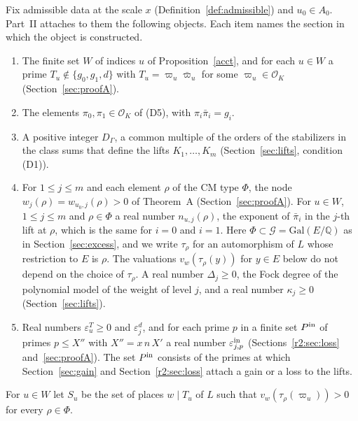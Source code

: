 Fix admissible data at the scale $x$ (Definition~\ref{def:admissible}) and $u_0\in A_0$. Part~II attaches to them the following objects. Each item names the section in which the object is constructed.
\begin{enumerate}
\item[(L1)] The finite set $W$ of indices $u$ of Proposition~\ref{acct}, and for each $u\in W$ a prime $T_u\notin\{g_0,g_1,d\}$ with $T_u=\varpi_u\bar\varpi_u$ for some $\varpi_u\in\mathcal O_K$ (Section~\ref{sec:proofA}).
\item[(L2)] The elements $\pi_0,\pi_1\in\mathcal O_K$ of (D5), with $\pi_i\bar\pi_i=g_i$.
\item[(L3)] A positive integer $D_\Gamma$, a common multiple of the orders of the stabilizers in the class sums that define the lifts $K_1,\dots,K_m$ (Section~\ref{sec:lifts}, condition (D1)).
\item[(L4)] For $1\le j\le m$ and each element $\rho$ of the CM type $\Phi$, the node $w_j(\rho)=w_{u_0,j}(\rho)>0$ of Theorem~A (Section~\ref{sec:proofA}). For $u\in W$, $1\le j\le m$ and $\rho\in\Phi$ a real number $n_{u,j}(\rho)$, the exponent of $\bar\pi_i$ in the $j$-th lift at $\rho$, which is the same for $i=0$ and $i=1$. Here $\Phi\subset\mathcal G=\mathrm{Gal}(E/\mathbb Q)$ as in Section~\ref{sec:excess}, and we write $\tau_\rho$ for an automorphism of $L$ whose restriction to $E$ is $\rho$. The valuations $v_w(\tau_\rho(y))$ for $y\in E$ below do not depend on the choice of $\tau_\rho$. A real number $\Delta_j\ge0$, the Fock degree of the polynomial model of the weight of level $j$, and a real number $\kappa_j\ge0$ (Section~\ref{sec:lifts}).
\item[(L5)] Real numbers $\varepsilon^T_u\ge0$ and $\varepsilon^d_j$, and for each prime $p$ in a finite set $P^{\rm in}$ of primes $p\le X''$ with $X''=x\,n\,X'$ a real number $\varepsilon^{\rm in}_{j,p}$ (Sections~\ref{r2:sec:loss} and~\ref{sec:proofA}). The set $P^{\rm in}$ consists of the primes at which Section~\ref{sec:gain} and Section~\ref{r2:sec:loss} attach a gain or a loss to the lifts.
\end{enumerate}
For $u\in W$ let $S_u$ be the set of places $w\mid T_u$ of $L$ such that $v_w(\tau_\rho(\varpi_u))>0$ for every $\rho\in\Phi$.


